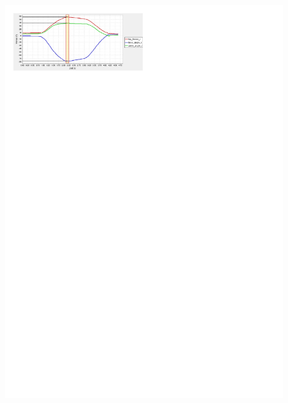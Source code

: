 		\begin{Figure}
			\centering
			\includegraphics[trim={0.5cm 24.25cm 10.5cm 0.5cm},clip,width=12cm]{content/opensim_joint_angles.pdf}
			\label{fig:excel}
		\end{Figure}
		
